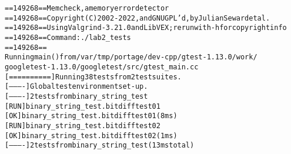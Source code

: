 \begin{alltt}
    ==149268== Memcheck, a memory error detector
    ==149268== Copyright (C) 2002-2022, and GNU GPL'd, by Julian Seward et al.
    ==149268== Using Valgrind-3.21.0 and LibVEX; rerun with -h for copyright info
    ==149268== Command: ./lab2_tests
    ==149268== 
    Running main() from /var/tmp/portage/dev-cpp/gtest-1.13.0/work/
    googletest-1.13.0/googletest/src/gtest_main.cc
    [==========] Running 38 tests from 2 test suites.
    [----------] Global test environment set-up.
    [----------] 2 tests from binary_string_test
    [ RUN      ] binary_string_test.bitdifftest01
    [       OK ] binary_string_test.bitdifftest01 (8 ms)
    [ RUN      ] binary_string_test.bitdifftest02
    [       OK ] binary_string_test.bitdifftest02 (1 ms)
    [----------] 2 tests from binary_string_test (13 ms total)
    

\end{alltt}
